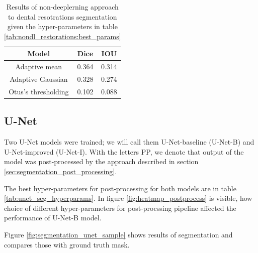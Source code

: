 \begin{table}[H]
    \centering
    \begin{tabular}{|c|c|c|}
        \hline
        Model               & Dice  & IOU   \\ \hline
        Adaptive mean       & 0.364 & 0.314 \\ \hline
        Adaptive Gaussian   & 0.328 & 0.274 \\ \hline
        Otus's thresholding & 0.102 & 0.088 \\ \hline
    \end{tabular}
    \caption{Results of non-deeplerning approach to dental resotrations segmentation given the hyper-parameters in table \ref{tab:nondl_restorations:best_params}}
    \label{tab:nondl_results}
\end{table}



\subsection{U-Net}
Two U-Net models were trained; we will call them U-Net-baseline (U-Net-B) and U-Net-improved (U-Net-I). With the letters PP, we denote that output of the model was post-processed by the approach described in section \ref{sec:segmentation_post_processing}.

The best hyper-parameters for post-processing for both models are in table \ref{tab:unet_seg_hyperparams}. In figure \ref{fig:heatmap_postprocess} is visible, how choice of different hyper-parameters for post-procssing pipeline affected the performance of U-Net-B model.

Figure \ref{fig:segmentation_unet_sample} shows results of segmentation and compares those with ground truth mask.

